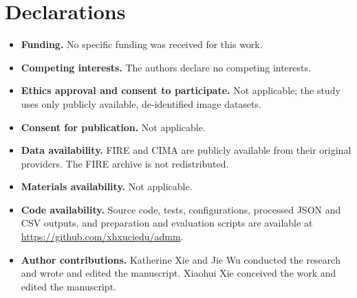 \documentclass[11pt]{article}
\theoremstyle{definition}
\begin{document}
\section*{Declarations}
\begin{itemize}
\item \textbf{Funding.} No specific funding was received for this work.
\item \textbf{Competing interests.} The authors declare no competing interests.
\item \textbf{Ethics approval and consent to participate.} Not applicable; the
study uses only publicly available, de-identified image datasets.
\item \textbf{Consent for publication.} Not applicable.
\item \textbf{Data availability.} FIRE \cite{HernandezMatas2017} and CIMA
\cite{Borovec2018} are publicly available from their original providers. The
FIRE archive is not redistributed.
\item \textbf{Materials availability.} Not applicable.
\item \textbf{Code availability.} Source code, tests, configurations, processed
JSON and CSV outputs, and preparation and evaluation scripts are available at
\url{https://github.com/xhxuciedu/admm}.
\item \textbf{Author contributions.} Katherine Xie and Jie Wu conducted the
research and wrote and edited the manuscript. Xiaohui Xie conceived the work
and edited the manuscript.
\end{itemize}

\appendix
\end{document}
